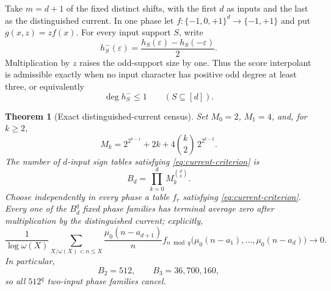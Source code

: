 \documentclass[11pt]{article}
\newtheorem{theorem}{Theorem}[section]
\theoremstyle{definition}
\theoremstyle{remark}
\newcommand{\mob}{\mu}
\newcommand{\T}{\{-1,0,+1\}}
\begin{document}
Take \(m=d+1\) of the fixed distinct shifts, with the first \(d\) as inputs
and the last as the distinguished current.  In one phase let
\(f:\T^d\to\{-1,+1\}\) and put \(g(x,z)=z f(x)\).  For every input support
\(S\), write
\[
 h_S^-(\varepsilon)=\frac{h_S(\varepsilon)-h_S(-\varepsilon)}2.
\]
Multiplication by \(z\) raises the odd-support size by one.  Thus the score
interpolant is admissible exactly when no input character has positive odd
degree at least three, or equivalently
\begin{equation}
 \deg h_S^-\leq1\qquad(S\subseteq[d]).
 \label{eq:current-criterion}
\end{equation}

\begin{theorem}[Exact distinguished-current census]
\label{thm:current}
Set \(M_0=2\), \(M_1=4\), and, for \(k\geq2\),
\begin{equation}
 M_k=2^{2^{k-1}}+2k+4\binom{k}{2}\,2^{2^{k-2}}.
 \label{eq:Mk}
\end{equation}
The number of \(d\)-input sign tables satisfying
\eqref{eq:current-criterion} is
\begin{equation}
 B_d=\prod_{k=0}^d M_k^{\binom{d}{k}}.
 \label{eq:Bd}
\end{equation}
Choose independently in every phase a table \(f_r\) satisfying
\eqref{eq:current-criterion}.  Every one of the \(B_d^q\) fixed phase
families has terminal average zero after multiplication by the distinguished
current; explicitly,
\begin{equation}
 \frac1{\log\omega(X)}\sum_{X/\omega(X)<n\leq X}
 \frac{\mob_0(n-a_{d+1})}{n}
 f_{n\bmod q}\bigl(\mob_0(n-a_1),\ldots,\mob_0(n-a_d)\bigr)
 \longrightarrow0.
 \label{eq:current-limit}
\end{equation}
In particular,
\[
 B_2=512,\qquad B_3=36{,}700{,}160,
\]
so all \(512^q\) two-input phase families cancel.
\end{theorem}
\end{document}
